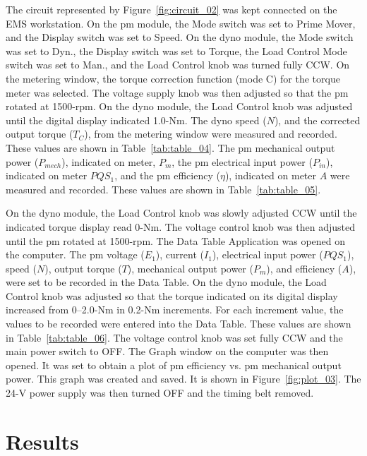 \documentclass{article}
\begin{document}
\label{part3} The circuit represented by Figure~\ref{fig:circuit_02} was kept
connected on the EMS workstation.  On the \gls{pm} module, the Mode switch was
set to Prime Mover, and the Display switch was set to Speed. On the \gls{dyno}
module, the Mode switch was set to Dyn., the Display switch was set to Torque,
the Load Control Mode switch was set to Man., and the Load Control knob was
turned fully {CCW}. On the metering window, the torque correction function
(mode C) for the torque meter was selected. The voltage supply knob was then
adjusted so that the \gls{pm} rotated at 1500-rpm. On the \gls{dyno} module,
the Load Control knob was adjusted until the digital display indicated 1.0-Nm.
The \gls{dyno} speed ($N$), and the corrected output torque ($T_C$), from the
metering window were measured and recorded. These values are shown in
Table~\ref{tab:table_04}. The \gls{pm} mechanical output power ($P_{mech}$),
indicated on meter, $P_m$, the \gls{pm} electrical input power ($P_{in}$),
indicated on meter $PQS_1$, and the \gls{pm} efficiency ($\eta$), indicated on
meter $A$ were measured and recorded. These values are shown in
Table~\ref{tab:table_05}.

On the \gls{dyno} module, the Load Control knob was slowly adjusted CCW until
the indicated torque display read 0-Nm. The voltage control knob was then
adjusted until the \gls{pm} rotated at 1500-rpm. The Data Table Application was
opened on the computer. The \gls{pm} voltage ($E_1$), current ($I_1$),
electrical input power ($PQS_1$), speed ($N$), output torque ($T$), mechanical
output power ($P_{m}$), and efficiency ($A$), were set to be recorded in the
Data Table. On the \gls{dyno} module, the Load Control knob was adjusted so
that the torque indicated on its digital display increased from 0--2.0-Nm in
0.2-Nm increments.  For each increment value, the values to be recorded were
entered into the Data Table. These values are shown in
Table~\ref{tab:table_06}. The voltage control knob was set fully CCW and the
main power switch to {OFF}. The Graph window on the computer was then opened.
It was set to obtain a plot of \gls{pm} efficiency vs. \gls{pm} mechanical
output power. This graph was created and saved. It is shown in
Figure~\ref{fig:plot_03}. The 24-V power supply was then turned OFF and the
timing belt removed.

\section{Results}
\end{document}

